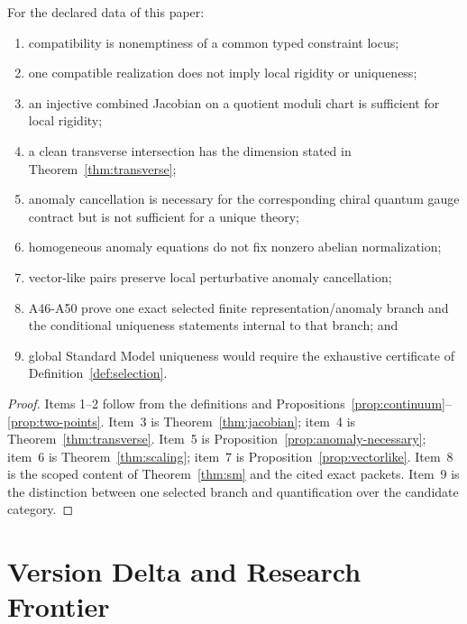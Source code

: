 \documentclass[11pt]{article}
\begin{document}
\begin{theorem}
\label{thm:scoped}
For the declared data of this paper:
\begin{enumerate}
\item compatibility is nonemptiness of a common typed constraint locus;
\item one compatible realization does not imply local rigidity or uniqueness;
\item an injective combined Jacobian on a quotient moduli chart is sufficient
for local rigidity;
\item a clean transverse intersection has the dimension stated in
Theorem~\ref{thm:transverse};
\item anomaly cancellation is necessary for the corresponding chiral quantum
gauge contract but is not sufficient for a unique theory;
\item homogeneous anomaly equations do not fix nonzero abelian normalization;
\item vector-like pairs preserve local perturbative anomaly cancellation;
\item A46-A50 prove one exact selected finite representation/anomaly branch and
the conditional uniqueness statements internal to that branch; and
\item global Standard Model uniqueness would require the exhaustive certificate
of Definition~\ref{def:selection}.
\end{enumerate}
\end{theorem}

\begin{proof}
Items 1--2 follow from the definitions and
Propositions~\ref{prop:continuum}--\ref{prop:two-points}.  Item~3 is
Theorem~\ref{thm:jacobian}; item~4 is
Theorem~\ref{thm:transverse}.  Item~5 is
Proposition~\ref{prop:anomaly-necessary}; item~6 is
Theorem~\ref{thm:scaling}; item~7 is
Proposition~\ref{prop:vectorlike}.  Item~8 is the scoped content of
Theorem~\ref{thm:sm} and the cited exact packets.  Item~9 is the distinction
between one selected branch and quantification over the candidate category.
\end{proof}

\section{Version Delta and Research Frontier}
\end{document}
